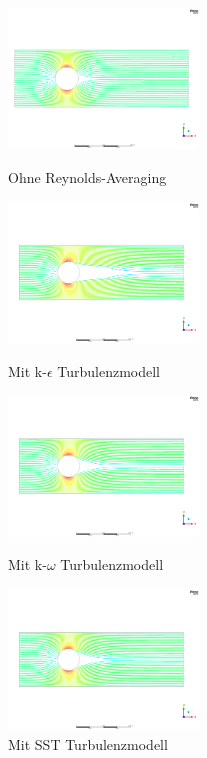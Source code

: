 \begin{refsection}
\begin{figure}
  \centering
  \includegraphics[width=0.45\textwidth]{papers/reynolds/images/dns.png}
  \caption{Ohne Reynolds-Averaging}
  \label{fig:ohne}
  \centering
  \includegraphics[width=0.45\textwidth]{papers/reynolds/images/k-e.png}
  \caption{Mit k-$\epsilon$ Turbulenzmodell}
  \label{fig:k-e}
  \centering
  \includegraphics[width=0.45\textwidth]{papers/reynolds/images/k-w.png}
  \caption{Mit k-$\omega$ Turbulenzmodell}
  \label{fig:k-w}
  \centering
  \includegraphics[width=0.45\textwidth]{papers/reynolds/images/sst.png}
  \caption{Mit SST Turbulenzmodell}
  \label{fig:SST}
\end{figure}


\end{refsection}
